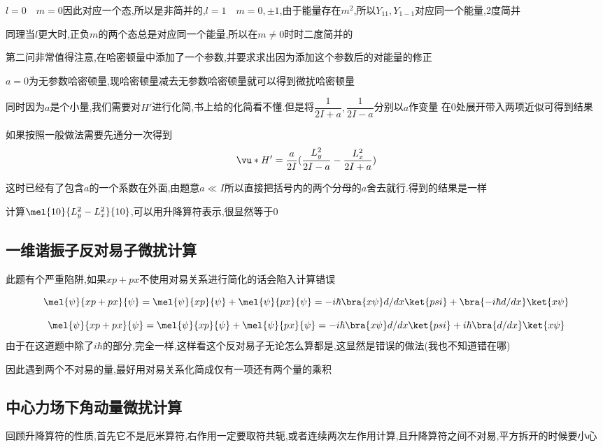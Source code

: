             $l=0 \quad m=0$因此对应一个态,所以是非简并的,$ l = 1 \quad m =0,\pm 1 $,由于能量存在$m^{2}$,所以$Y_{11},Y_{1-1}$对应同一个能量,2度简并
            
            同理当$l$更大时,正负$m$的两个态总是对应同一个能量,所以在$m \neq 0$时时二度简并的
            
            第二问非常值得注意,在哈密顿量中添加了一个参数,并要求求出因为添加这个参数后的对能量的修正

            $a=0$为无参数哈密顿量,现哈密顿量减去无参数哈密顿量就可以得到微扰哈密顿量

            同时因为$a$是个小量,我们需要对$H'$进行化简,书上给的化简看不懂.但是将$ \dfrac{1}{2I+a},\dfrac{1}{2I-a}$分别以$a$作变量
            在0处展开带入两项近似可得到结果

            如果按照一般做法需要先通分一次得到
            $$ \vu*{H}' = \frac{a}{2I} ( \frac{L_{y}^{2}}{2I-a} -  \frac{L_{x}^{2}}{2I+a}) $$
            
            这时已经有了包含$a$的一个系数在外面,由题意$a \ll I $所以直接把括号内的两个分母的$a$舍去就行.得到的结果是一样
            
            计算$ \mel{10}{L_{y}^{2} - L_{x}^{2}}{10} $,可以用升降算符表示,很显然等于0
        
        \subsection{一维谐振子反对易子微扰计算}
            此题有个严重陷阱,如果$xp+px$不使用对易关系进行简化的话会陷入计算错误

            $$ 
            \mel{\psi}{xp+px}{\psi} = \mel{\psi}{xp}{\psi}+\mel{\psi}{px}{\psi} 
            = -i\hbar \bra{x\psi}d/dx \ket{psi} + \bra{-i\hbar d/dx}\ket{x\psi} 
            $$

            $$
            \mel{\psi}{xp+px}{\psi} = \mel{\psi}{xp}{\psi}+\mel{\psi}{px}{\psi} 
            = -i\hbar \bra{x\psi}d/dx \ket{psi} + i \hbar \bra{d/dx}\ket{x\psi} 
            $$
            由于在这道题中除了$i \hbar$的部分,完全一样,这样看这个反对易子无论怎么算都是,这显然是错误的做法(我也不知道错在哪)

            因此遇到两个不对易的量,最好用对易关系化简成仅有一项还有两个量的乘积

        \subsection{中心力场下角动量微扰计算}
            回顾升降算符的性质,首先它不是厄米算符,右作用一定要取符共轭,或者连续两次左作用计算,且升降算符之间不对易,平方拆开的时候要小心
        
